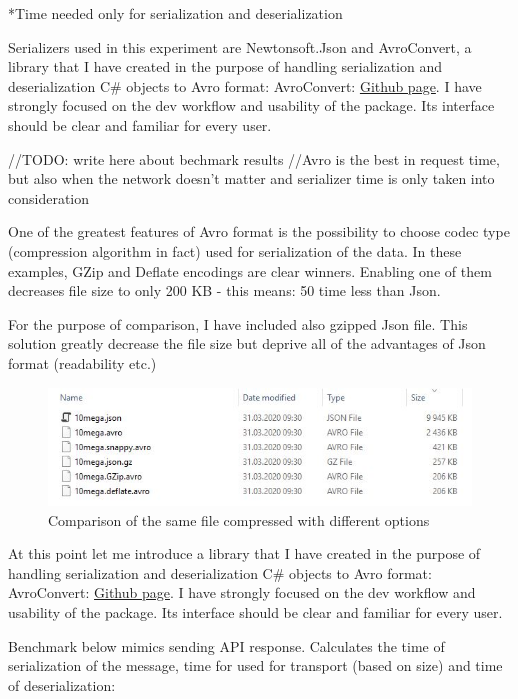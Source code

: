 \documentclass[]{article}
\begin{document}
*Time needed only for serialization and deserialization


Serializers used in this experiment are Newtonsoft.Json and AvroConvert, a library that I have created in the purpose of handling serialization and deserialization C\# objects to Avro format: AvroConvert: 
\href{https://github.com/AdrianStrugala/AvroConvert}{Github page}.
I have strongly focused on the dev workflow and usability of the package. Its interface should be clear and familiar for every user.   


//TODO: write here about bechmark results
//Avro is the best in request time, but also when the network doesn't matter and serializer time is only taken into consideration


One of the greatest features of Avro format is the possibility to choose codec type (compression algorithm in fact) used for serialization of the data. In these examples, GZip and Deflate encodings are clear winners. Enabling one of them decreases file size to only 200 KB - this means: 50 time less than Json.

For the purpose of comparison, I have included also gzipped Json file. This solution greatly decrease the file size but deprive all of the advantages of Json format (readability etc.)

\begin{figure}[H]
	\centering
	\includegraphics[width=\textwidth]{size_comparison}
	\caption{Comparison of the same file compressed with different options}
\end{figure}

At this point let me introduce a library that I have created in the purpose of handling serialization and deserialization C\# objects to Avro format: AvroConvert: 
\href{https://github.com/AdrianStrugala/AvroConvert}{Github page}.
I have strongly focused on the dev workflow and usability of the package. Its interface should be clear and familiar for every user.   

Benchmark below mimics sending API response. Calculates the time of serialization of the message, time for used for transport (based on size) and time of deserialization:  
\end{document}
